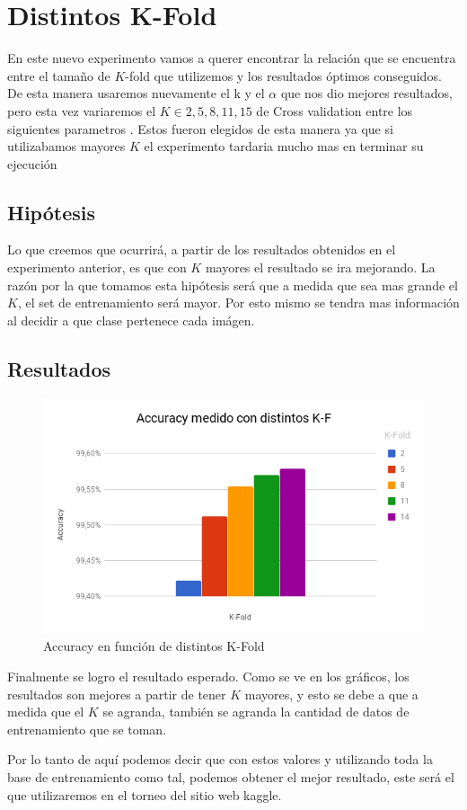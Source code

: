 \section{Distintos K-Fold}

En este nuevo experimento vamos a querer encontrar la relación que se encuentra entre el tamaño de $K$-fold que utilizemos y los resultados óptimos conseguidos. De esta manera usaremos nuevamente el k y el $\alpha$ que nos dio mejores resultados, pero esta vez variaremos el $K \in {2,5,8,11,15}$ de Cross validation entre los siguientes parametros . Estos fueron elegidos de esta manera ya que si utilizabamos mayores $K$ el experimento tardaria mucho mas en terminar su ejecución


\subsection{Hipótesis}

Lo que creemos que ocurrirá, a partir de los resultados obtenidos en el experimento anterior, es que con $K$ mayores el resultado se ira mejorando. La razón por la que tomamos esta hipótesis será que a medida que sea mas grande el $K$, el set de entrenamiento será mayor. Por esto mismo se tendra mas información al decidir a que clase pertenece cada imágen.

\subsection{Resultados}

\begin{figure}
	\centering
	\includegraphics[width=\textwidth]{graficos/Distintos_kfold.png}
	\caption{Accuracy en función de distintos K-Fold}
	\label{fig:distintos_kfold}
\end{figure}

Finalmente se logro el resultado esperado. Como se ve en los gráficos, los resultados son mejores a partir de tener $K$ mayores, y esto se debe a que a medida que el $K$ se agranda, también se agranda la cantidad de datos de entrenamiento que se toman.

Por lo tanto de aquí podemos decir que con estos valores y utilizando toda la base de entrenamiento como tal, podemos obtener el mejor resultado, este será el que utilizaremos en el torneo del sitio web kaggle.
